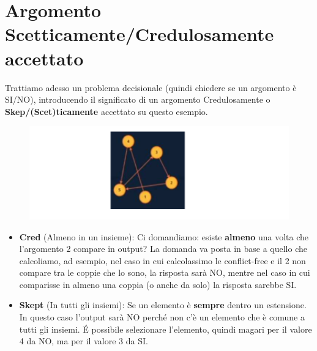 \section{Argomento Scetticamente/Credulosamente accettato}
Trattiamo adesso un problema decisionale (quindi chiedere se un argomento è
SI/NO), introducendo il significato di un argomento Credulosamente o
\textbf{Skep/(Scet)ticamente }accettato su questo esempio.
\begin{figure}[htp]
    \centering
    \includegraphics[width=14cm, keepaspectratio]{img/Cap6/scet.png}
\end{figure}
\begin{itemize}
    \item \textbf{Cred} (Almeno in un insieme): Ci domandiamo: esiste
          \textbf{almeno} una volta che l'argomento 2 compare in output? La
          domanda va posta in base a quello che calcoliamo, ad esempio, nel caso
          in cui calcolassimo le conflict-free e il 2 non compare tra le coppie
          che lo sono, la risposta sarà NO, mentre nel caso in cui comparisse in
          almeno una coppia (o anche da solo) la risposta sarebbe SI.
    \item \textbf{Skept} (In tutti gli insiemi): Se un elemento è
          \textbf{sempre} dentro un estensione. In questo caso l'output sarà NO
          perché non c'è un elemento che è comune a tutti gli insiemi. É possibile
          selezionare l'elemento, quindi magari per il valore 4 da NO, ma per il
          valore 3 da SI.
\end{itemize}
